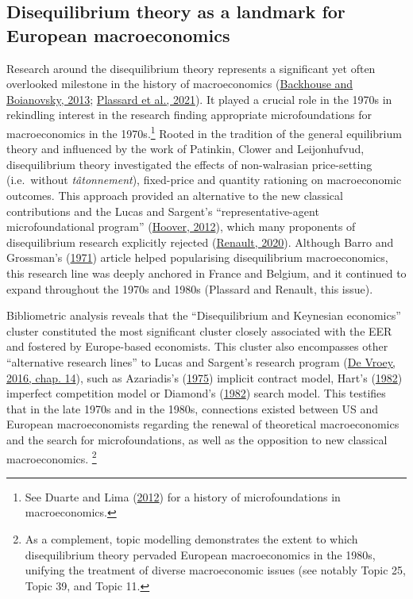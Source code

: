 \documentclass[
  12pt,
  onecolumn]{article}
\begin{document}
\hypertarget{disequilibrium}{%
\subsection{Disequilibrium theory as a landmark for European macroeconomics}\label{disequilibrium}}

Research around the disequilibrium theory represents a significant yet often overlooked milestone in the history of macroeconomics (\protect\hyperlink{ref-backhouseboianovski2013}{Backhouse and Boianovsky, 2013}; \protect\hyperlink{ref-plassard2021}{Plassard et al., 2021}). It played a crucial role in the 1970s in rekindling interest in the research finding appropriate microfoundations for macroeconomics in the 1970s.\footnote{See Duarte and Lima (\protect\hyperlink{ref-duartelima2012a}{2012}) for a history of microfoundations in macroeconomics.} Rooted in the tradition of the general equilibrium theory and influenced by the work of Patinkin, Clower and Leijonhufvud, disequilibrium theory investigated the effects of non-walrasian price-setting (i.e.~without \emph{tâtonnement}), fixed-price and quantity rationing on macroeconomic outcomes. This approach provided an alternative to the new classical contributions and the Lucas and Sargent's ``representative-agent microfoundational program'' (\protect\hyperlink{ref-hoover2012}{Hoover, 2012}), which many proponents of disequilibrium research explicitly rejected (\protect\hyperlink{ref-renault2020a}{Renault, 2020}). Although Barro and Grossman's (\protect\hyperlink{ref-barro1971}{1971}) article helped popularising disequilibrium macroeconomics, this research line was deeply anchored in France and Belgium, and it continued to expand throughout the 1970s and 1980s (Plassard and Renault, this issue).

Bibliometric analysis reveals that the ``Disequilibrium and Keynesian economics'' cluster constituted the most significant cluster closely associated with the EER and fostered by Europe-based economists. This cluster also encompasses other ``alternative research lines'' to Lucas and Sargent's research program (\protect\hyperlink{ref-devroey2016}{De Vroey, 2016, chap. 14}), such as Azariadis's (\protect\hyperlink{ref-azariadis1975}{1975}) implicit contract model, Hart's (\protect\hyperlink{ref-hart1982}{1982}) imperfect competition model or Diamond's (\protect\hyperlink{ref-diamond1982}{1982}) search model. This testifies that in the late 1970s and in the 1980s, connections existed between US and European macroeconomists regarding the renewal of theoretical macroeconomics and the search for microfoundations, as well as the opposition to new classical macroeconomics. \footnote{As a complement, topic modelling demonstrates the extent to which disequilibrium theory pervaded European macroeconomics in the 1980s, unifying the treatment of diverse macroeconomic issues (see notably Topic 25, Topic 39, and Topic 11.}
\end{document}
